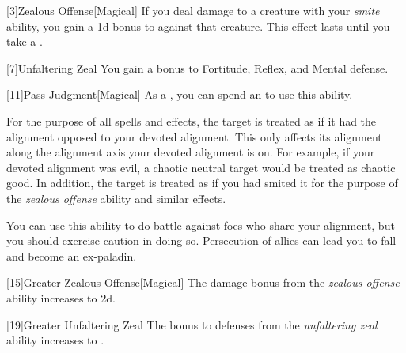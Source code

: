             [3]{Zealous Offense}[Magical]
            If you deal damage to a creature with your \textit{smite} ability, you gain a \plus1d bonus to  against that creature.
            This effect lasts until you take a .

            [7]{Unfaltering Zeal}
            You gain a  bonus to Fortitude, Reflex, and Mental defense.

            [11]{Pass Judgment}[Magical] As a , you can spend an  to use this ability.
            \begin{ability}
                \begin{spelltargetinginfo}
                \end{spelltargetinginfo}
                \begin{spelleffects}
                    \spelleffect For the purpose of all spells and effects, the target is treated as if it had the alignment opposed to your devoted alignment.
                    This only affects its alignment along the alignment axis your devoted alignment is on.
                    For example, if your devoted alignment was evil, a chaotic neutral target would be treated as chaotic good.
                    In addition, the target is treated as if you had smited it for the purpose of the \textit{zealous offense} ability and similar effects.

                    You can use this ability to do battle against foes who share your alignment, but you should exercise caution in doing so.
                    Persecution of allies can lead you to fall and become an ex-paladin.
                \end{spelleffects}
            \end{ability}

            [15]{Greater Zealous Offense}[Magical]
            The damage bonus from the \textit{zealous offense} ability increases to \plus2d.

            [19]{Greater Unfaltering Zeal}
            The bonus to defenses from the \textit{unfaltering zeal} ability increases to .

